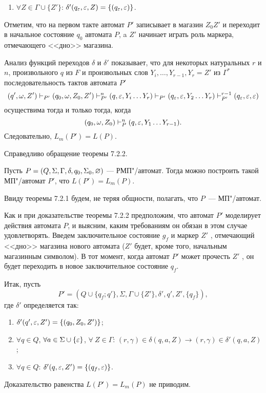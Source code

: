 \begin{myproof}
\begin{enumerate}
    \item $\forall Z\in\Gamma\cup\{Z'\}$:
        $\delta'(q_\varepsilon,\varepsilon,Z)=\{(q_\varepsilon,\varepsilon)\}$.
\end{enumerate}

Отметим, что на первом такте автомат $P'$ записывает в магазин $Z_0Z'$ и переходит в начальное состояние $q_0$ автомата $P$, a $Z'$ начинает играть роль маркера, отмечающего <<дно>> магазина.

Анализ функций переходов $\delta$ и $\delta'$ показывает, что для некоторых натуральных $r$ и $n$, произвольного $q$ из $F$ и произвольных слов $Y_i, \ldots , Y_{r-1}, Y_r=Z'$ из $\Gamma^*$ последовательность тактов автомата $P'$
\[
    (q',\omega,Z')
        \vdash_{P'} (q_0,\omega,Z_0,Z')
        \vdash_{P'}^n (q,\varepsilon,Y_i \ldots Y_r)
        \vdash_{P'} (q_\varepsilon,\varepsilon,Y_2 \ldots Y_r)
        \vdash_{P'}^{r-1} (q_\varepsilon,\varepsilon,\varepsilon)
\]
осуществима тогда и только тогда, когда
\[
    (q_0,\omega,Z_0) \vdash_P^n (q, \varepsilon, Y_1 \ldots Y_{r-1}).
\]
Следовательно, $L_m(P')=L(P)$.
\end{myproof}

Справедливо обращение теоремы 7.2.2.

\begin{mytheorem}
Пусть $P=(Q,\Sigma,\Gamma,\delta,q_0,\Sigma_0,\varnothing)$ --- РМП"/автомат. Тогда можно построить такой МП"/автомат $P'$, что $L(P')=L_m(P)$.
\end{mytheorem}

\begin{myproof}
Ввиду теоремы 7.2.1 будем, не теряя общности, полагать, что
$P$~--- МП"/автомат.

Как и при доказательстве теоремы 7.2.2 предположим, что автомат $P'$ моделирует действия автомата $P$, и выясним, каким требованиям он обязан в этом случае удовлетворять. Введем заключительное состояние $g_f$ и маркер $Z'$ , отмечающий <<дно>> магазина нового автомата ($Z'$ будет, кроме того, начальным магазинным символом). В тот момент, когда автомат $P'$ может прочесть $Z'$ , он будет переходить в новое заключительное состояние $q_f$.

Итак, пусть
\[
P' = (Q\cup\{q_f;q'\},\Sigma,\Gamma\cup\{Z'\},\delta' ,q' ,Z' ,\{q_f\}),
\]
где $\delta'$ определяется так:
\begin{enumerate}
    \item $\delta' (q',\varepsilon,Z')=\{(q_0,Z_0,Z')\}$;

    \item $\forall q\in Q$, $\forall a\in\Sigma\cup\{\varepsilon\}$,
    $\forall\ Z\in\Gamma$:
        $(r,\gamma)\in\delta(q,a,Z)\to(r,\gamma)\in\delta'(q,a,Z)$;

    \item $\forall q\in Q$: $\delta'(q,\varepsilon,Z')=\{(q_f,\varepsilon)\}$.
\end{enumerate}

Доказательство равенства $L(P')=L_m(P)$ не приводим.
\end{myproof}

